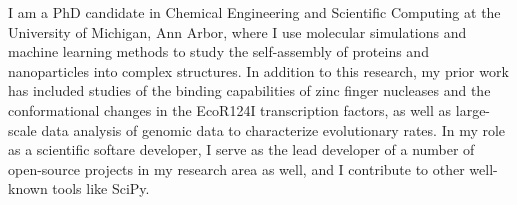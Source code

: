 \begin{cvparagraph}

I am a PhD candidate in Chemical Engineering and Scientific Computing at the University of Michigan, Ann Arbor, where I use molecular simulations and machine learning methods to study the self-assembly of proteins and nanoparticles into complex structures.
In addition to this research, my prior work has included studies of the binding capabilities of zinc finger nucleases and the conformational changes in the EcoR124I transcription factors, as well as large-scale data analysis of genomic data to characterize evolutionary rates.
In my role as a scientific softare developer, I serve as the lead developer of a number of open-source projects in my research area as well, and I contribute to other well-known tools like SciPy.
\end{cvparagraph}
